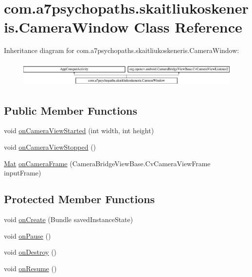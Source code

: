 \hypertarget{classcom_1_1a7psychopaths_1_1skaitliukoskeneris_1_1_camera_window}{}\section{com.\+a7psychopaths.\+skaitliukoskeneris.\+Camera\+Window Class Reference}
\label{classcom_1_1a7psychopaths_1_1skaitliukoskeneris_1_1_camera_window}
Inheritance diagram for com.\+a7psychopaths.\+skaitliukoskeneris.\+Camera\+Window\+:\begin{figure}[H]
\begin{center}
\leavevmode
\includegraphics[height=1.342926cm]{classcom_1_1a7psychopaths_1_1skaitliukoskeneris_1_1_camera_window}
\end{center}
\end{figure}
\subsection*{Public Member Functions}
\begin{DoxyCompactItemize}
\item 
void \mbox{\hyperlink{classcom_1_1a7psychopaths_1_1skaitliukoskeneris_1_1_camera_window_a204ec7def65b3ce5a29720b67b03a77c}{on\+Camera\+View\+Started}} (int width, int height)
\item 
void \mbox{\hyperlink{classcom_1_1a7psychopaths_1_1skaitliukoskeneris_1_1_camera_window_a17537fd517c83369e27b6ff3f26b38e7}{on\+Camera\+View\+Stopped}} ()
\item 
\mbox{\hyperlink{classorg_1_1opencv_1_1core_1_1_mat}{Mat}} \mbox{\hyperlink{classcom_1_1a7psychopaths_1_1skaitliukoskeneris_1_1_camera_window_a2ee3840e4c61b7ab95e2dc3f6407aad0}{on\+Camera\+Frame}} (Camera\+Bridge\+View\+Base.\+Cv\+Camera\+View\+Frame input\+Frame)
\end{DoxyCompactItemize}
\subsection*{Protected Member Functions}
\begin{DoxyCompactItemize}
\item 
void \mbox{\hyperlink{classcom_1_1a7psychopaths_1_1skaitliukoskeneris_1_1_camera_window_ab1a9b0e84f3a97826c665d40a3df91a5}{on\+Create}} (Bundle saved\+Instance\+State)
\item 
void \mbox{\hyperlink{classcom_1_1a7psychopaths_1_1skaitliukoskeneris_1_1_camera_window_aadb82216e2fa64f7081100aaccf2d75a}{on\+Pause}} ()
\item 
void \mbox{\hyperlink{classcom_1_1a7psychopaths_1_1skaitliukoskeneris_1_1_camera_window_a3a739c080b032f16a599e3473e169acb}{on\+Destroy}} ()
\item 
void \mbox{\hyperlink{classcom_1_1a7psychopaths_1_1skaitliukoskeneris_1_1_camera_window_abd0a1b9f76fb6b6a601515d1fcd49283}{on\+Resume}} ()
\end{DoxyCompactItemize}


